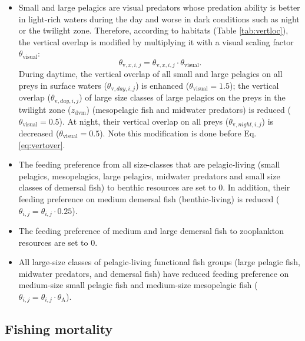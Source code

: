 \documentclass[
]{article}
\begin{document}
\begin{itemize}
\item
  Small and large pelagics are visual predators whose predation ability
  is better in light-rich waters during the day and worse in dark
  conditions such as night or the twilight zone. Therefore, according to
  habitats (Table \ref{tab:vertloc}), the vertical overlap is modified
  by multiplying it with a visual scaling factor
  \(\theta_{\mathrm{visual}}\): \begin{equation}
  \theta_{\mathrm{v},x,i,j} = \theta_{\mathrm{v},x,i,j} \cdot \theta_{\mathrm{visual}} .
  \end{equation} During daytime, the vertical overlap of all small and
  large pelagics on all preys in surface waters
  (\(\theta_{\mathrm{v},day,i,j}\)) is enhanced
  (\(\theta_{\mathrm{visual}}=1.5\)); the vertical overlap
  (\(\theta_{\mathrm{v},day,i,j}\)) of large size classes of large
  pelagics on the preys in the twilight zone (\(z_{\mathrm{dvm}}\))
  (mesopelagic fish and midwater predators) is reduced
  (\(\theta_{\mathrm{visual}}=0.5\)). At night, their vertical overlap
  on all preys (\(\theta_{\mathrm{v},night,i,j}\)) is decreased
  (\(\theta_{\mathrm{visual}}=0.5\)). Note this modification is done
  before Eq. \ref{eq:vertover}.
\item
  The feeding preference from all size-classes that are pelagic-living
  (small pelagics, mesopelagics, large pelagics, midwater predators and
  small size classes of demersal fish) to benthic resources are set to
  0. In addition, their feeding preference on medium demersal fish
  (benthic-living) is reduced
  (\(\theta_{i,j}=\theta_{i,j} \cdot 0.25\)).
\item
  The feeding preference of medium and large demersal fish to
  zooplankton resources are set to 0.
\item
  All large-size classes of pelagic-living functional fish groups (large
  pelagic fish, midwater predators, and demersal fish) have reduced
  feeding preference on medium-size small pelagic fish and medium-size
  mesopelagic fish
  (\(\theta_{i,j}=\theta_{i,j} \cdot \theta_{\mathrm{A}}\)).
\end{itemize}

\hypertarget{fishing-mortality}{%
\subsection{Fishing mortality}\label{fishing-mortality}}
\end{document}
